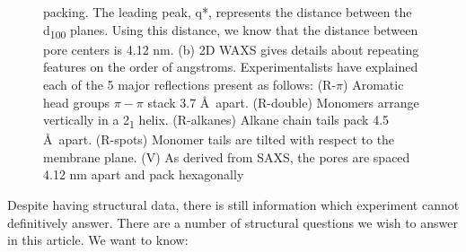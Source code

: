 \documentclass[journal=jpcbfk,manuscript=article]{achemso}
\begin{document}
\begin{figure}[!htb]
{		packing. The leading peak, q*, represents the distance between the
		d\textsubscript{100} planes. Using this distance, we know that the distance
		between pore centers is 4.12 nm. (b) 2D WAXS gives
		details about repeating features on the order of angstroms. Experimentalists
		have explained each of the 5 major reflections present as follows: (R-$\pi$) Aromatic
		head groups $\pi-\pi$ stack 3.7 \AA~apart. (R-double) Monomers arrange vertically in
		a 2\textsubscript{1} helix. (R-alkanes) Alkane chain tails pack 4.5 \AA~apart. (R-spots)
		Monomer tails are tilted with respect to the membrane plane. (V) As derived from
		SAXS, the pores are spaced 4.12 nm apart and pack hexagonally}
	\label{fig:SWAXS}
 \end{figure}
  
  Despite having structural data, there is still information which experiment cannot
  definitively answer. There are a number of structural questions we wish to answer in this 
  article. We want to know:
\end{document}
